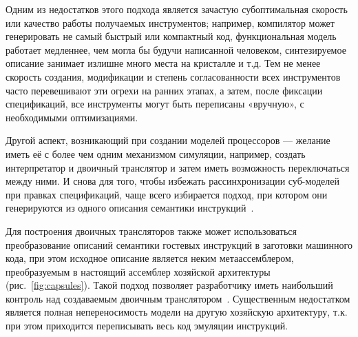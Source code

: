 Одним из недостатков этого подхода является зачастую субоптимальная скорость или качество работы получаемых инструментов; например, компилятор может генерировать не самый быстрый или компактный код, функциональная модель работает медленнее, чем могла бы будучи написанной человеком, синтезируемое описание занимает излишне много места на кристалле и т.д. Тем не менее скорость создания, модификации и степень согласованности всех инструментов часто перевешивают эти огрехи на ранних этапах, а затем, после фиксации спецификаций, все инструменты могут быть переписаны «вручную», с необходимыми оптимизациями.

Другой аспект, возникающий при создании моделей процессоров --- желание иметь её с более чем одним механизмом симуляции, например, создать интерпретатор и двоичный транслятор и затем иметь возможность переключаться между ними. И снова для того, чтобы избежать рассинхронизации суб-моделей при правках спецификаций, чаще всего избирается подход,  при котором они генерируются из одного описания семантики инструкций~\cite{simgen}.

Для построения двоичных трансляторов также может использоваться преобразование описаний семантики гостевых инструкций в заготовки машинного кода, при этом исходное описание является неким метаассемблером, преобразуемым в настоящий ассемблер хозяйской архитектуры (рис.~\ref{fig:capsules}). Такой подход позволяет разработчику иметь наибольший контроль над создаваемым двоичным транслятором~\cite{MyConfMIPT52}. Существенным недостатком является полная непереносимость модели на другую хозяйскую архитектуру, т.к. при этом приходится переписывать весь код эмуляции инструкций.

